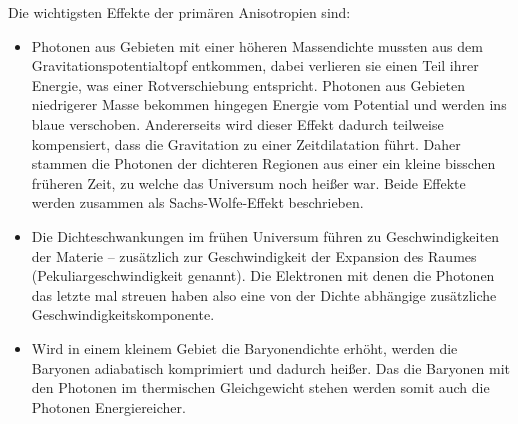 \documentclass[10pt,a4paper]{article}
\begin{document}
Die wichtigsten Effekte der primären Anisotropien sind:
\begin{itemize}
\item Photonen aus Gebieten mit einer höheren Massendichte mussten aus dem Gravitationspotentialtopf entkommen, dabei verlieren sie einen Teil ihrer Energie, was einer Rotverschiebung entspricht. Photonen aus Gebieten niedrigerer Masse bekommen hingegen Energie vom Potential und werden ins blaue verschoben. Andererseits wird dieser Effekt dadurch teilweise kompensiert, dass die Gravitation zu einer Zeitdilatation führt. Daher stammen die Photonen der dichteren Regionen aus einer ein kleine bisschen früheren Zeit, zu welche das Universum noch heißer war. Beide Effekte werden zusammen als Sachs-Wolfe-Effekt beschrieben.
\item Die Dichteschwankungen im frühen Universum führen zu Geschwindigkeiten der Materie -- zusätzlich zur Geschwindigkeit der Expansion des Raumes (Pekuliargeschwindigkeit genannt). Die Elektronen mit denen die Photonen das letzte mal streuen haben also eine von der Dichte abhängige zusätzliche Geschwindigkeitskomponente. %
\item Wird in einem kleinem Gebiet die Baryonendichte erhöht, werden die Baryonen adiabatisch komprimiert und dadurch heißer. Das die Baryonen mit den Photonen im thermischen Gleichgewicht stehen werden somit auch die Photonen Energiereicher.
\end{itemize}
\end{document}
